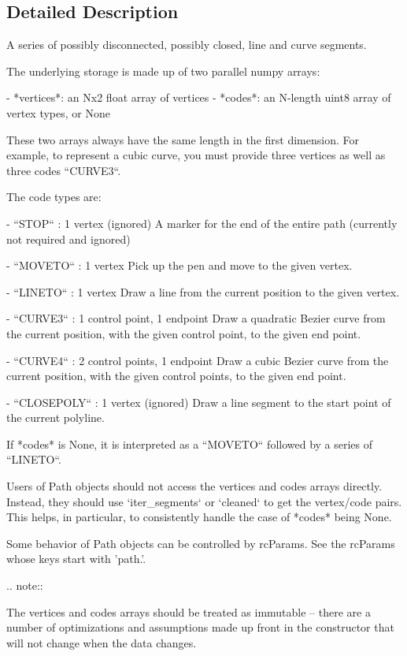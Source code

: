 \subsection{Detailed Description}
\begin{DoxyVerb}A series of possibly disconnected, possibly closed, line and curve
segments.

The underlying storage is made up of two parallel numpy arrays:

- *vertices*: an Nx2 float array of vertices
- *codes*: an N-length uint8 array of vertex types, or None

These two arrays always have the same length in the first
dimension.  For example, to represent a cubic curve, you must
provide three vertices as well as three codes ``CURVE3``.

The code types are:

- ``STOP``   :  1 vertex (ignored)
    A marker for the end of the entire path (currently not required and
    ignored)

- ``MOVETO`` :  1 vertex
    Pick up the pen and move to the given vertex.

- ``LINETO`` :  1 vertex
    Draw a line from the current position to the given vertex.

- ``CURVE3`` :  1 control point, 1 endpoint
    Draw a quadratic Bezier curve from the current position, with the given
    control point, to the given end point.

- ``CURVE4`` :  2 control points, 1 endpoint
    Draw a cubic Bezier curve from the current position, with the given
    control points, to the given end point.

- ``CLOSEPOLY`` : 1 vertex (ignored)
    Draw a line segment to the start point of the current polyline.

If *codes* is None, it is interpreted as a ``MOVETO`` followed by a series
of ``LINETO``.

Users of Path objects should not access the vertices and codes arrays
directly.  Instead, they should use `iter_segments` or `cleaned` to get the
vertex/code pairs.  This helps, in particular, to consistently handle the
case of *codes* being None.

Some behavior of Path objects can be controlled by rcParams. See the
rcParams whose keys start with 'path.'.

.. note::

    The vertices and codes arrays should be treated as
    immutable -- there are a number of optimizations and assumptions
    made up front in the constructor that will not change when the
    data changes.
\end{DoxyVerb}
 

